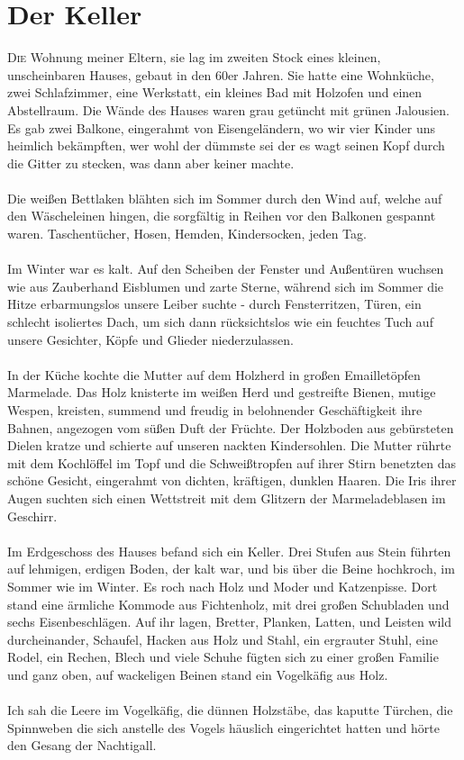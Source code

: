 \chapter{Der Keller}
\lettrine{D}{ie} Wohnung meiner Eltern, sie lag im zweiten Stock eines kleinen, unscheinbaren Hauses, gebaut in den 60er Jahren. Sie hatte eine Wohnküche, zwei Schlafzimmer, eine Werkstatt, ein kleines Bad mit Holzofen und einen Abstellraum. Die Wände des Hauses waren grau getüncht mit grünen Jalousien. Es gab zwei Balkone, eingerahmt von Eisengeländern, wo wir vier Kinder uns heimlich bekämpften, wer wohl der dümmste sei der es wagt seinen Kopf durch die Gitter zu stecken, was dann aber keiner machte.\\\\
Die weißen Bettlaken blähten sich im Sommer durch den Wind auf, welche auf den Wäscheleinen hingen, die sorgfältig in Reihen vor den Balkonen gespannt waren. Taschentücher, Hosen, Hemden, Kindersocken, jeden Tag.\\\\
Im Winter war es kalt. Auf den Scheiben der Fenster und Außentüren wuchsen wie aus Zauberhand  Eisblumen und zarte Sterne, während sich im Sommer die Hitze erbarmungslos unsere Leiber suchte - durch Fensterritzen, Türen, ein schlecht isoliertes Dach, um sich dann rücksichtslos wie ein feuchtes Tuch auf unsere Gesichter, Köpfe und Glieder niederzulassen. \\\\
In der Küche kochte die Mutter auf dem Holzherd in großen Emailletöpfen Marmelade. Das Holz knisterte im weißen Herd und gestreifte Bienen, mutige Wespen, kreisten, summend und freudig in belohnender Geschäftigkeit ihre Bahnen, angezogen vom süßen Duft der Früchte. Der Holzboden aus gebürsteten Dielen kratze und schierte auf unseren nackten Kindersohlen. Die Mutter rührte mit dem Kochlöffel im Topf und die Schweißtropfen auf ihrer Stirn benetzten das schöne Gesicht, eingerahmt von dichten, kräftigen, dunklen Haaren. Die Iris ihrer Augen suchten sich einen Wettstreit mit dem Glitzern der Marmeladeblasen im Geschirr. \\\\
Im Erdgeschoss des Hauses befand sich ein Keller. Drei Stufen aus Stein führten auf lehmigen, erdigen Boden, der kalt war, und bis über die Beine hochkroch, im Sommer wie im Winter. Es roch nach Holz und Moder und Katzenpisse. Dort stand eine ärmliche Kommode aus Fichtenholz, mit drei großen Schubladen und sechs Eisenbeschlägen. Auf ihr lagen, Bretter, Planken, Latten, und Leisten wild durcheinander, Schaufel, Hacken aus Holz und Stahl, ein ergrauter Stuhl, eine Rodel, ein Rechen, Blech und viele Schuhe fügten sich zu einer großen Familie und ganz oben, auf wackeligen Beinen stand ein Vogelkäfig aus Holz. \\\\
Ich sah die Leere im Vogelkäfig, die dünnen Holzstäbe, das kaputte Türchen, die Spinnweben die sich anstelle des Vogels häuslich eingerichtet hatten und hörte den Gesang der Nachtigall.

